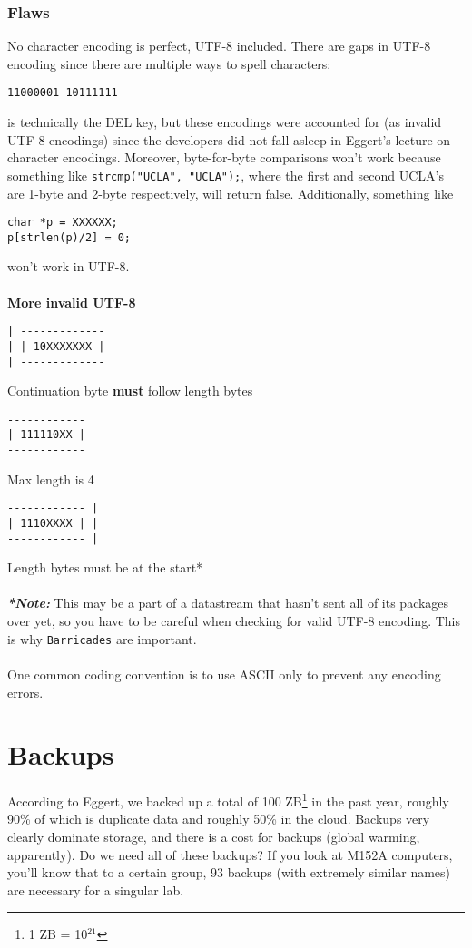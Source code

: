 \documentclass[13pt]{article}
\begin{document}
\subsubsection{Flaws}
No character encoding is perfect, UTF-8 included. There are gaps in UTF-8 encoding since there are multiple ways to spell characters:
\begin{verbatim}
11000001 10111111
\end{verbatim}
is technically the DEL key, but these encodings were accounted for (as invalid UTF-8 encodings) since the developers did not fall asleep in Eggert's lecture on character encodings. Moreover, byte-for-byte comparisons won't work because something like \texttt{strcmp("UCLA", "UCLA");}, where the first and second UCLA's are 1-byte and 2-byte respectively, will return false. Additionally, something like
\begin{verbatim}
char *p = XXXXXX;
p[strlen(p)/2] = 0;
\end{verbatim}
won't work in UTF-8. \\ \\
\textbf{More invalid UTF-8}
\begin{verbatim}
| ------------- 
| | 10XXXXXXX | 
| -------------
\end{verbatim}
Continuation byte \textbf{must} follow length bytes
\begin{verbatim}
------------
| 111110XX |
------------
\end{verbatim}
Max length is 4
\begin{verbatim}
------------ |
| 1110XXXX | |
------------ |
\end{verbatim}
Length bytes must be at the start* \\ \\
\textit{\textbf{*Note:}} This may be a part of a datastream that hasn't sent all of its packages over yet, so you have to be careful when checking for valid UTF-8 encoding. This is why \texttt{Barricades} are important. \\ \\
One common coding convention is to use ASCII only to prevent any encoding errors.





\section{Backups}
According to Eggert, we backed up a total of 100 ZB\footnote{1 ZB = 10$^{21}$} in the past year, roughly 90\% of which is duplicate data and roughly 50\% in the cloud. Backups very clearly dominate storage, and there is a cost for backups (global warming, apparently). Do we need all of these backups? If you look at M152A computers, you'll know that to a certain group, 93 backups (with extremely similar names) are necessary for a singular lab.
\end{document}
